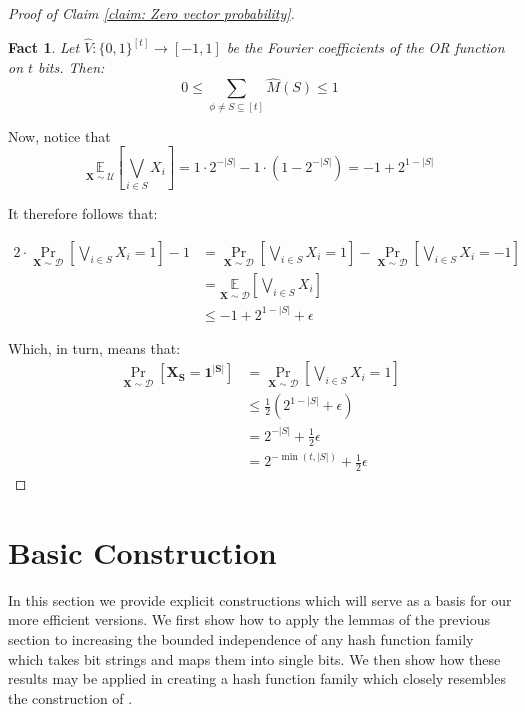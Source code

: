 \documentclass[12pt]{article}
\newtheorem{fact}[theorem]{Fact}
\newcommand{\dist}{\mathcal{D}}
\newcommand{\E}{\mathbb{E}}
\newcommand{\abs}[1]{\left| #1 \right|}
\renewcommand{\vec}[1]{\bm{#1}}
\begin{document}
\begin{proof}[Proof of Claim \ref{claim: Zero vector probability}]
		\begin{fact}
			Let $\hat{V} : \{0,1\}^{\left[ t \right]} \rightarrow \left[-1,1\right]$ be the Fourier coefficients of the OR function on $t$ bits. Then:
			\begin{equation*}
			0 \leq \sum_{\phi \neq S \subseteq \left[ t \right]} \hat{M}(S) \leq 1
			\end{equation*}
		\end{fact}
		
		Now, notice that
		\begin{equation*}
		\underset{\vec{X} \sim \mathcal{U}}{\E} \left[ \bigvee_{i \in S} X_i \right]
		= 1 \cdot 2^{-\abs{S}} - 1 \cdot (1 - 2^{-\abs{S}}) = -1 + 2^{1-\abs{S}}
		\end{equation*}
		
		It therefore follows that:
		
		\begin{align*}
		2 \cdot \Pr_{\vec{X} \sim \dist} \left[ \bigvee_{i \in S} X_i = 1 \right] - 1
		&= \Pr_{\vec{X} \sim \dist} \left[ \bigvee_{i \in S} X_i = 1 \right]
			- \Pr_{\vec{X} \sim \dist} \left[ \bigvee_{i \in S} X_i = -1 \right] \\
		&= \underset{\vec{X} \sim \dist}{\E} \left[ \bigvee_{i \in S} X_i \right] \\
		&\leq -1 + 2^{1-\abs{S}} + \epsilon
		\end{align*}
		
		Which, in turn, means that:
		\begin{align*}
		\Pr_{\vec{X} \sim \dist} \left[ \vec{X_S} = \vec{1^{\abs{S}}} \right]
		&= \Pr_{\vec{X} \sim \dist} \left[ \bigvee_{i \in S} X_i = 1 \right] \\
		&\leq \frac{1}{2} \left( 2^{1-\abs{S}} + \epsilon \right) \\
		&= 2^{-\abs{S}} + \frac{1}{2}\epsilon \\
		&= 2^{-\min\left(t, \abs{S}\right)} + \frac{1}{2}\epsilon
		\end{align*}
		
	\end{proof}
	

\section{Basic Construction} \label{section: generic constructions}
	
	In this section we provide explicit constructions which will serve as a basis for our more efficient versions.
	We first show how to apply the lemmas of the previous section to increasing the bounded independence of any hash function family which takes bit strings and maps them into single bits.
	We then show how these results may be applied in creating a hash function family which closely resembles the construction of \cite{Valiant}.
	
\end{document}
